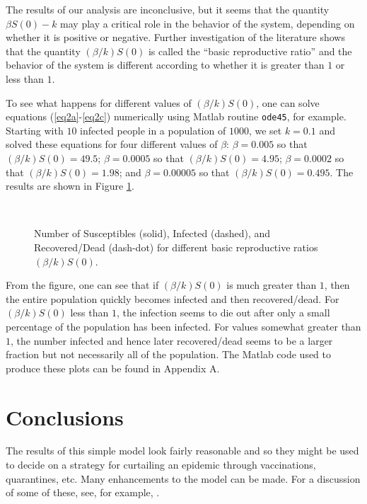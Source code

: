\documentclass[11pt]{article}
\begin{document}
The results of our analysis are inconclusive, but it seems that the
quantity $\beta S(0) - k$ may play a critical role in the behavior of
the system, depending on whether it is positive or negative.  Further 
investigation of the literature \cite{Johnson} shows that the quantity
$( \beta / k ) S(0)$ is called the ``basic reproductive ratio'' and the
behavior of the system is different according to whether it is greater
than $1$ or less than $1$.

To see what happens for different values of $( \beta / k ) S(0)$, one can solve 
equations (\ref{eq2a}-\ref{eq2c}) numerically using Matlab routine \verb+ode45+, 
for example.  Starting with $10$ infected people in a population of $1000$, we 
set $k = 0.1$ and solved these equations for four different values of $\beta$:  
$\beta = 0.005$ so that $( \beta / k ) S(0) = 49.5$; 
$\beta = 0.0005$ so that $( \beta / k ) S(0) = 4.95$;
$\beta = 0.0002$ so that $( \beta / k ) S(0) = 1.98$; and
$\beta = 0.00005$ so that $( \beta / k ) S(0) = 0.495$.
The results are shown in Figure \ref{fig1}.

\begin{figure}[ht]
\begin{center}
  \\
\end{center}
\caption{Number of Susceptibles (solid), Infected (dashed), and Recovered/Dead (dash-dot)
for different basic reproductive ratios $( \beta / k ) S(0)$.}  
\label{fig1}
\end{figure}

From the figure, one can see that if $( \beta / k ) S(0)$ is much greater than $1$,
then the entire population quickly becomes infected and then recovered/dead.
For $( \beta / k ) S(0)$ less than $1$, the infection seems to die out after
only a small percentage of the population has been infected.  For values
somewhat greater than $1$, the number infected and hence later recovered/dead
seems to be a larger fraction but not necessarily all of the population.
The Matlab code used to produce these plots can be found in Appendix A.

\section{Conclusions}
The results of this simple model look fairly reasonable and so they might be
used to decide on a strategy for curtailing an epidemic through vaccinations,
quarantines, etc.  Many enhancements to the model can be made.  For a discussion 
of some of these, see, for example, \cite{Wikipedia}.  
\end{document}
